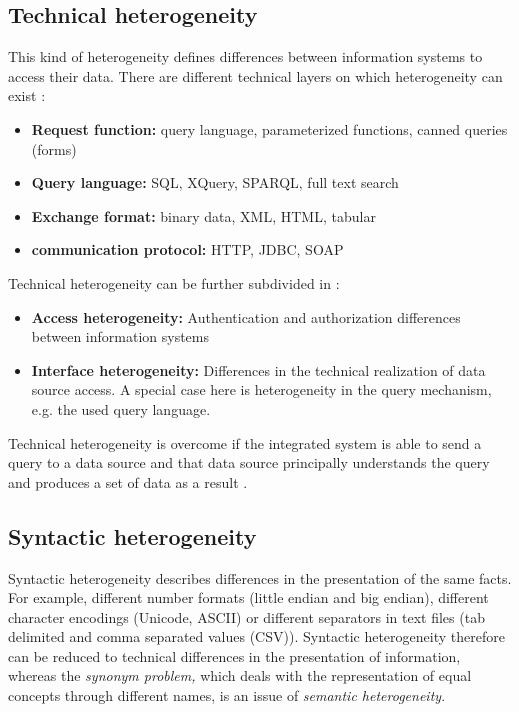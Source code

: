 \subsection{Technical  heterogeneity}
This kind of heterogeneity defines differences between information systems to access their data. There are different technical layers on which heterogeneity can exist \cite[p. 62]{DBLP:books/dp/LeserN2006}:
\begin{itemize}
\item \textbf{Request function:} query language, parameterized  functions, canned queries (forms)
\item \textbf{Query language:} SQL, XQuery, SPARQL, full text search
\item \textbf{Exchange format:} binary data, XML, HTML, tabular
\item \textbf{communication protocol:} HTTP, JDBC, SOAP
\end{itemize}

Technical heterogeneity can be further subdivided in \cite[p. 64]{DBLP:books/dp/LeserN2006}: \label{technical_heterogeneity_subtypes}
\begin{itemize}
\item \textbf{Access heterogeneity:} Authentication and authorization differences between information systems
\item \textbf{Interface heterogeneity:} Differences in the technical realization of data source access. A special case here is heterogeneity in the query mechanism, e.g. the used query language.
\end{itemize}

Technical  heterogeneity is overcome if the integrated system is able to send a query to a data source and that data source principally understands the query and produces a set of data as a result \cite[p. 61]{DBLP:books/dp/LeserN2006}.

\subsection{Syntactic  heterogeneity}
Syntactic heterogeneity describes differences in the presentation of the same facts\cite[p. 64]{DBLP:books/dp/LeserN2006}. For example, different number formats (little endian and big endian), different character encodings (Unicode, ASCII) or different separators in text files (tab delimited and comma separated values (CSV)). Syntactic heterogeneity therefore can be reduced to technical differences in the presentation of information, whereas the \textit{synonym problem,} which deals with the representation of equal concepts through different names, is an issue of \textit{semantic heterogeneity}.

